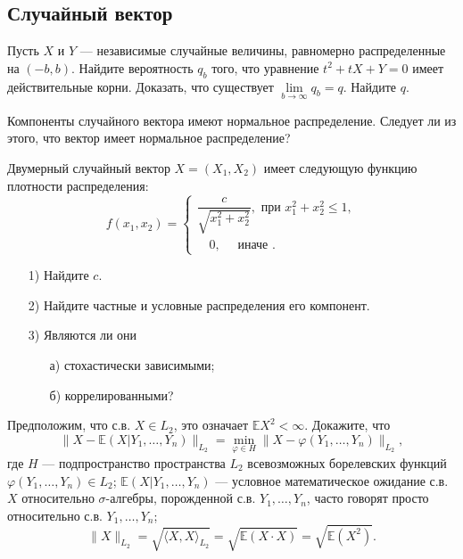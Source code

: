 \subsection{Случайный вектор}



\begin{problem}
Пусть $X$ и $Y$ --- независимые случайные величины, равномерно распределенные на $(-b,b)$. 
Найдите вероятность $q_b$ того, что уравнение $t^2+tX+Y=0$ имеет действительные корни. Доказать, что 
существует $\lim\limits_{b\to\infty} q_b=q$. Найдите $q$. 
\end{problem}


\begin{problem}
Компоненты случайного вектора имеют нормальное распределение. Следует ли из этого, что вектор имеет нормальное распределение? 
\end{problem}

\begin{problem}
Двумерный случайный вектор $X=(X_1,X_2)$  имеет следующую функцию плотности распределения: 
$$
f(x_1,x_2)=\begin{cases}
\dfrac{c}{\sqrt{x_1^2+x_2^2}}, \text{ при } x_1^2+x_2^2\leqslant 1 , \\
\quad 0, \quad\text{ иначе }. 
\end{cases}
$$
\begin{enumerate}
\item[1)] Найдите $c$. 
\item[2)] Найдите частные и условные распределения его компонент. 
\item[3)] Являются ли они 
\begin{enumerate}
\item[а)] стохастически зависимыми; 
\item[б)] коррелированными? 
\end{enumerate}
\end{enumerate}
\end{problem}



\begin{problem}
Предположим, что с.в. $X\in L_2$, это означает ${\mathbb E}X^2<\infty$. Докажите, что 
\begin{equation}
\label{UMO}
\| X-{\mathbb E}(X|Y_1,\ldots,Y_n)\|_{L_2}=\min\limits_{\varphi\in H} \| X-\varphi(Y_1,\ldots,Y_n)\|_{L_2} , 
\end{equation}
где $H$ --- подпространство пространства $L_2$ всевозможных борелевских функций $\varphi(Y_1,\ldots,Y_n)\in L_2$; 
${\mathbb E}(X|Y_1,\ldots,Y_n)$ --- условное математическое ожидание с.в. $X$ относительно $\sigma$-алгебры, порожденной с.в. 
$Y_1,\ldots,Y_n$, часто говорят просто относительно с.в. $Y_1,\ldots,Y_n$; 
$$
\| X\|_{L_2}=\sqrt{\langle X,X\rangle_{L_2}}=\sqrt{{\mathbb E}(X\cdot X)}=\sqrt{{\mathbb E}(X^2)} . 
$$
\end{problem}

